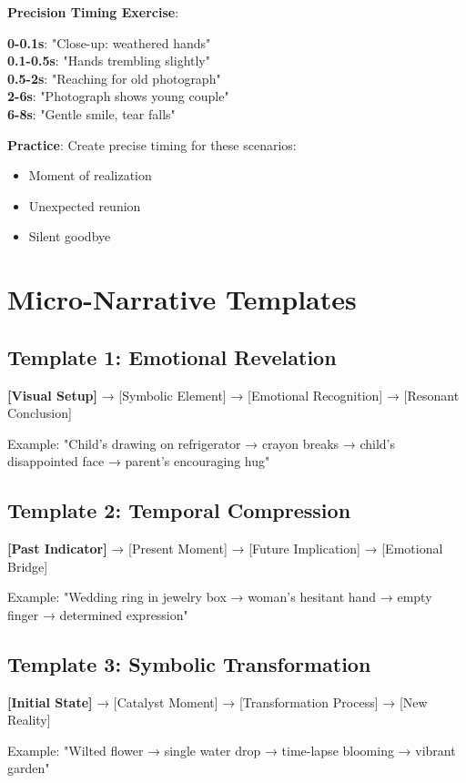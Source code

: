 \textbf{Precision Timing Exercise}:
\begin{Prompt}
\textbf{0-0.1s}: "Close-up: weathered hands"\\
\textbf{0.1-0.5s}: "Hands trembling slightly"\\
\textbf{0.5-2s}: "Reaching for old photograph"\\
\textbf{2-6s}: "Photograph shows young couple"\\
\textbf{6-8s}: "Gentle smile, tear falls"
\end{Prompt}

\textbf{Practice}: Create precise timing for these scenarios:
\begin{itemize}
\item Moment of realization
\item Unexpected reunion
\item Silent goodbye
\end{itemize}

\section*{Micro-Narrative Templates}

\subsection*{Template 1: Emotional Revelation}
\begin{Prompt}
\textbf{[Visual Setup]} → [Symbolic Element] → [Emotional Recognition] → [Resonant Conclusion]

Example: "Child's drawing on refrigerator → crayon breaks → child's disappointed face → parent's encouraging hug"
\end{Prompt}

\subsection*{Template 2: Temporal Compression}
\begin{Prompt}
\textbf{[Past Indicator]} → [Present Moment] → [Future Implication] → [Emotional Bridge]

Example: "Wedding ring in jewelry box → woman's hesitant hand → empty finger → determined expression"
\end{Prompt}

\subsection*{Template 3: Symbolic Transformation}
\begin{Prompt}
\textbf{[Initial State]} → [Catalyst Moment] → [Transformation Process] → [New Reality]

Example: "Wilted flower → single water drop → time-lapse blooming → vibrant garden"
\end{Prompt}


